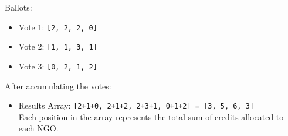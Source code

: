 Ballots:

\begin{itemize}
	\item Vote 1: \texttt{[2, 2, 2, 0]}
	\item Vote 2: \texttt{[1, 1, 3, 1]}
	\item Vote 3: \texttt{[0, 2, 1, 2]}
\end{itemize}


After accumulating the votes:


\begin{itemize}
	\item Results Array: \texttt{[2+1+0, 2+1+2, 2+3+1, 0+1+2] = [3, 5, 6, 3]} \\
	Each position in the array represents the total sum of credits allocated to each NGO.
\end{itemize}

